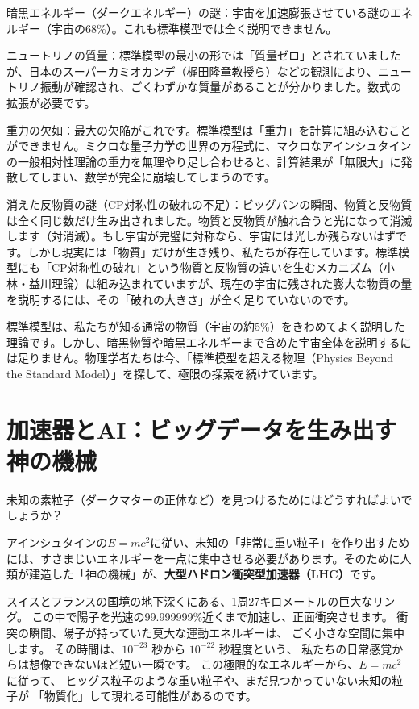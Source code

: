 暗黒エネルギー（ダークエネルギー）の謎：宇宙を加速膨張させている謎のエネルギー（宇宙の68\%）。これも標準模型では全く説明できません。

ニュートリノの質量：標準模型の最小の形では「質量ゼロ」とされていましたが、日本のスーパーカミオカンデ（梶田隆章教授ら）などの観測により、ニュートリノ振動が確認され、ごくわずかな質量があることが分かりました。数式の拡張が必要です。

重力の欠如：最大の欠陥がこれです。標準模型は「重力」を計算に組み込むことができません。ミクロな量子力学の世界の方程式に、マクロなアインシュタインの一般相対性理論の重力を無理やり足し合わせると、計算結果が「無限大」に発散してしまい、数学が完全に崩壊してしまうのです。

消えた反物質の謎（CP対称性の破れの不足）：ビッグバンの瞬間、物質と反物質は全く同じ数だけ生み出されました。物質と反物質が触れ合うと光になって消滅します（対消滅）。もし宇宙が完璧に対称なら、宇宙には光しか残らないはずです。しかし現実には「物質」だけが生き残り、私たちが存在しています。標準模型にも「CP対称性の破れ」という物質と反物質の違いを生むメカニズム（小林・益川理論）は組み込まれていますが、現在の宇宙に残された膨大な物質の量を説明するには、その「破れの大きさ」が全く足りていないのです。

標準模型は、私たちが知る通常の物質（宇宙の約5\%）をきわめてよく説明した理論です。しかし、暗黒物質や暗黒エネルギーまで含めた宇宙全体を説明するには足りません。物理学者たちは今、「標準模型を超える物理（Physics Beyond the Standard Model）」を探して、極限の探索を続けています。

\section{加速器とAI：ビッグデータを生み出す神の機械}

未知の素粒子（ダークマターの正体など）を見つけるためにはどうすればよいでしょうか？

アインシュタインの\(E=mc^2\)に従い、未知の「非常に重い粒子」を作り出すためには、すさまじいエネルギーを一点に集中させる必要があります。そのために人類が建造した「神の機械」が、\textbf{大型ハドロン衝突型加速器（LHC）}です。

スイスとフランスの国境の地下深くにある、1周27キロメートルの巨大なリング。
この中で陽子を光速の99.999999\%近くまで加速し、正面衝突させます。
衝突の瞬間、陽子が持っていた莫大な運動エネルギーは、
ごく小さな空間に集中します。
その時間は、\(10^{-23}\) 秒から \(10^{-22}\) 秒程度という、
私たちの日常感覚からは想像できないほど短い一瞬です。
この極限的なエネルギーから、\(E=mc^2\) に従って、
ヒッグス粒子のような重い粒子や、まだ見つかっていない未知の粒子が
「物質化」して現れる可能性があるのです。

